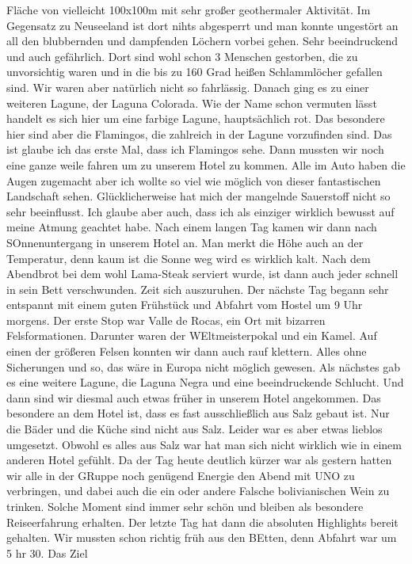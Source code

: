 \documentclass[11pt]{book}
\begin{document}
Fläche von vielleicht 100x100m mit sehr großer geothermaler Aktivität. Im Gegensatz zu Neuseeland ist dort nihts abgesperrt und man konnte ungestört 
an all den blubbernden und dampfenden Löchern vorbei gehen. Sehr beeindruckend und auch gefährlich. Dort sind wohl schon 3 Menschen gestorben, die zu 
unvorsichtig waren und in die bis zu 160 Grad heißen Schlammlöcher gefallen sind. Wir waren aber natürlich nicht so fahrlässig. Danach ging es zu einer 
weiteren Lagune, der Laguna Colorada. Wie der Name schon vermuten lässt handelt es sich hier um eine farbige Lagune, hauptsächlich rot. Das besondere 
hier sind aber die Flamingos, die zahlreich in der Lagune vorzufinden sind. Das ist glaube ich das erste Mal, dass ich Flamingos sehe. Dann mussten 
wir noch eine ganze weile fahren um zu unserem Hotel zu kommen. Alle im Auto haben die Augen zugemacht aber ich wollte so viel wie möglich von dieser 
fantastischen Landschaft sehen. Glücklicherweise hat mich der mangelnde Sauerstoff nicht so sehr beeinflusst. Ich glaube aber auch, dass ich als einziger 
wirklich bewusst auf meine Atmung geachtet habe. Nach einem langen Tag kamen wir dann nach SOnnenuntergang in unserem Hotel an. Man merkt die Höhe auch 
an der Temperatur, denn kaum ist die Sonne weg wird es wirklich kalt. Nach dem Abendbrot bei dem wohl Lama-Steak serviert wurde, ist dann auch jeder 
schnell in sein Bett verschwunden. Zeit sich auszuruhen. 
Der nächste Tag begann sehr entspannt mit einem guten Frühstück und Abfahrt vom Hostel um 9 Uhr morgens. Der erste Stop war Valle de Rocas, ein Ort 
mit bizarren Felsformationen. Darunter waren der WEltmeisterpokal und ein Kamel. Auf einen der größeren Felsen konnten wir dann auch rauf klettern. 
Alles ohne Sicherungen und so, das wäre in Europa nicht möglich gewesen. Als nächstes gab es eine weitere Lagune, die Laguna Negra und eine beeindruckende 
Schlucht. Und dann sind wir diesmal auch etwas früher in unserem Hotel angekommen. Das besondere an dem Hotel ist, dass es fast ausschließlich aus 
Salz gebaut ist. Nur die Bäder und die Küche sind nicht aus Salz. Leider war es aber etwas lieblos umgesetzt. Obwohl es alles aus Salz war hat man sich nicht 
wirklich wie in einem anderen Hotel gefühlt. Da der Tag heute deutlich kürzer war als gestern hatten wir alle in der GRuppe noch genügend Energie 
den Abend mit UNO zu verbringen, und dabei auch die ein oder andere Falsche bolivianischen Wein zu trinken. Solche Moment sind immer sehr schön und 
bleiben als besondere Reiseerfahrung erhalten. 
Der letzte Tag hat dann die absoluten Highlights bereit gehalten. Wir mussten schon richtig früh aus den BEtten, denn Abfahrt war um 5 hr 30. Das Ziel 
\end{document}
